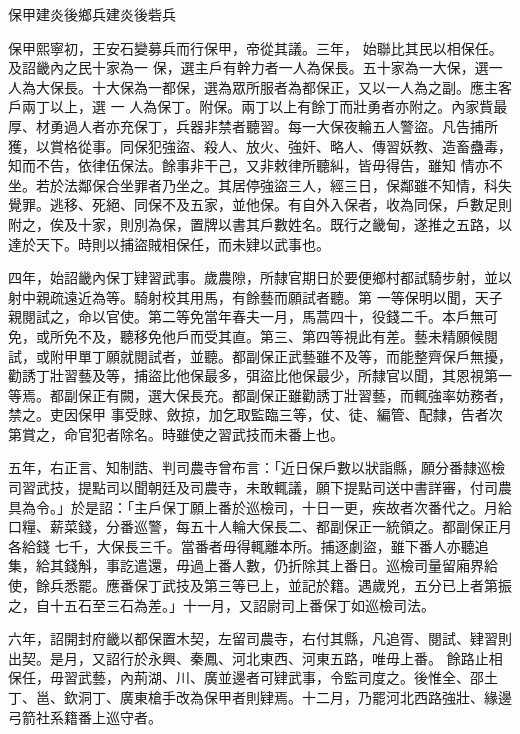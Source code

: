 
\begin{pinyinscope}

 保甲建炎後鄉兵建炎後砦兵



 保甲熙寧初，王安石變募兵而行保甲，帝從其議。三年，
 始聯比其民以相保任。及詔畿內之民十家為一
 保，選主戶有幹力者一人為保長。五十家為一大保，選一人為大保長。十大保為一都保，選為眾所服者為都保正，又以一人為之副。應主客戶兩丁以上，選
 一
 人為保丁。附保。兩丁以上有餘丁而壯勇者亦附之。內家貲最厚、材勇過人者亦充保丁，兵器非禁者聽習。每一大保夜輪五人警盜。凡告捕所獲，以賞格從事。同保犯強盜、殺人、放火、強奸、略人、傳習妖教、造畜蠱毒，知而不告，依律伍保法。餘事非干己，又非敕律所聽糾，皆毋得告，雖知
 情亦不坐。若於法鄰保合坐罪者乃坐之。其居停強盜三人，經三日，保鄰雖不知情，科失覺罪。逃移、死絕、同保不及五家，並他保。有自外入保者，收為同保，戶數足則附之，俟及十家，則別為保，置牌以書其戶數姓名。既行之畿甸，遂推之五路，以達於天下。時則以捕盜賊相保任，而未肄以武事也。



 四年，始詔畿內保丁肄習武事。歲農隙，所隸官期日於要便鄉村都試騎步射，並以射中親疏遠近為等。騎射校其用馬，有餘藝而願試者聽。第
 一等保明以聞，天子親閱試之，命以官使。第二等免當年春夫一月，馬蒿四十，役錢二千。本戶無可免，或所免不及，聽移免他戶而受其直。第三、第四等視此有差。藝未精願候閱試，或附甲單丁願就閱試者，並聽。都副保正武藝雖不及等，而能整齊保戶無擾，勸誘丁壯習藝及等，捕盜比他保最多，弭盜比他保最少，所隸官以聞，其恩視第一等焉。都副保正有闕，選大保長充。都副保正雖勸誘丁壯習藝，而輒強率妨務者，禁之。吏因保甲
 事受賕、斂掠，加乞取監臨三等，仗、徒、編管、配隸，告者次第賞之，命官犯者除名。時雖使之習武技而未番上也。



 五年，右正言、知制誥、判司農寺曾布言：「近日保戶數以狀詣縣，願分番隸巡檢司習武技，提點司以聞朝廷及司農寺，未敢輒議，願下提點司送中書詳審，付司農具為令。」於是詔：「主戶保丁願上番於巡檢司，十日一更，疾故者次番代之。月給口糧、薪菜錢，分番巡警，每五十人輪大保長二、都副保正一統領之。都副保正月各給錢
 七千，大保長三千。當番者毋得輒離本所。捕逐劇盜，雖下番人亦聽追集，給其錢斛，事訖遣還，毋過上番人數，仍折除其上番日。巡檢司量留廂界給使，餘兵悉罷。應番保丁武技及第三等已上，並記於籍。遇歲兇，五分已上者第振之，自十五石至三石為差。」十一月，又詔尉司上番保丁如巡檢司法。



 六年，詔開封府畿以都保置木契，左留司農寺，右付其縣，凡追胥、閱試、肄習則出契。是月，又詔行於永興、秦鳳、河北東西、河東五路，唯毋上番。
 餘路止相保任，毋習武藝，內荊湖、川、廣並邊者可肄武事，令監司度之。後惟全、邵土丁、邕、欽洞丁、廣東槍手改為保甲者則肄焉。十二月，乃罷河北西路強壯、緣邊弓箭社系籍番上巡守者。




\end{pinyinscope}
